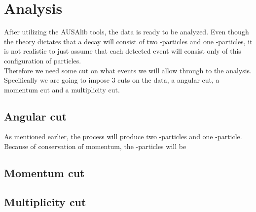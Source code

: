 \chapter{Analysis}
After utilizing the AUSAlib tools, the data is ready to be analyzed. Even though the theory dictates that a decay will consist of two \al-particles and one \be-particles, it is not realistic to just assume that each detected event will consist only of this configuration of particles. \\
Therefore we need some cut on what events we will allow through to the analysis. Specifically we are going to impose 3 cuts on the data, a angular cut, a momentum cut and a multiplicity cut.


\section{Angular cut}
As mentioned earlier, the process will produce two \al-particles and one \be-particle. 
Because of conservation of momentum, the \al-particles will be

\section{Momentum cut}

\section{Multiplicity cut}